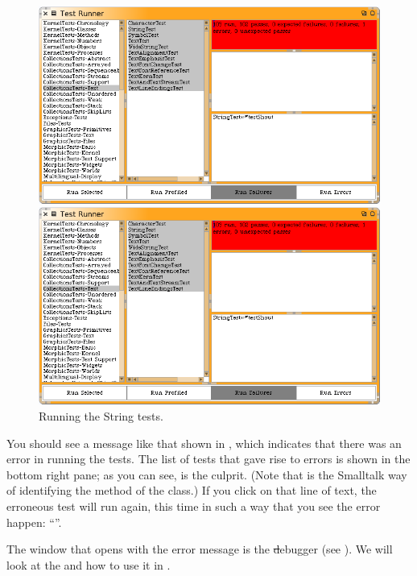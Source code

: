 \documentclass[a4paper,10pt,twoside]{book}
\begin{document}
\begin{figure}[hbt]
\ifluluelse
	{\centerline {\includegraphics[width=\textwidth]{testRunnerOnStringTest}}}
	{\centerline {\includegraphics[scale=0.5]{testRunnerOnStringTest}}}
\caption{Running the String tests.
\label{fig:testRunnerTestShout}}
\end{figure}

You should see a message like that shown in , which indicates that there was an error in running the tests.  The list of tests that gave rise to errors is shown in the bottom right pane; as you can see,  is the culprit.
(Note that  is the Smalltalk way of identifying the  method of the  class.)
If you click on that line of text, the erroneous test will run again, this time in such a way that you see the error happen: ``''.

The window that opens with the error message is the \st debugger (see ).
We will look at the  and how to use it in .
\end{document}
